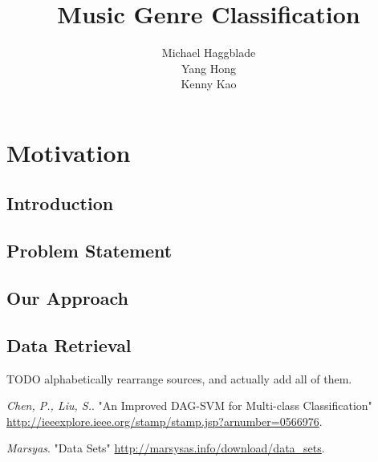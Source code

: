 \documentclass{article} %
\title{Music Genre Classification}
\author{
Michael Haggblade \\
\And
Yang Hong \\
\And
Kenny Kao
}
\begin{document}
\maketitle


\section{Motivation}

\subsection{Introduction}


\subsection{Problem Statement}



\subsection{Our Approach}

\subsection{Data Retrieval}


TODO alphabetically rearrange sources, and actually add all of them.
\begin{thebibliography}{9}
  \emph{Chen, P., Liu, S.}.
  "An Improved DAG-SVM for Multi-class Classification"
  \url{http://ieeexplore.ieee.org/stamp/stamp.jsp?arnumber=0566976}.

  \emph{Marsyas}.
  "Data Sets"
  \url{http://marsysas.info/download/data\_sets}.

\end{thebibliography}
\end{document}
